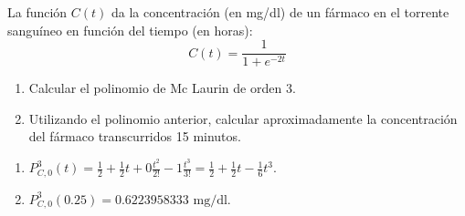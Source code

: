 {La función $C(t)$ da la concentración (en mg/dl) de un fármaco en el torrente sanguíneo en función del tiempo (en horas):
\[
C(t) = \frac{1}{{1 + e^{-2t}}}
\]
\begin{enumerate}
\item Calcular el polinomio de Mc Laurin de orden 3.

\item Utilizando el polinomio anterior, calcular aproximadamente la concentración del fármaco transcurridos 15 minutos.
\end{enumerate}
}
{
\begin{enumerate}
\item $P_{C,0}^3(t)=\frac{1}{2}+\frac{1}{2}t+0\frac{t^2}{2!}-1\frac{t^3}{3!}=\frac{1}{2}+\frac{1}{2}t-\frac{1}{6}t^3$.
\item $P_{C,0}^3(0.25)= 0.6223958333 \mbox{ mg/dl}$.
\end{enumerate}
}
